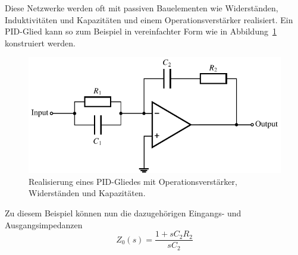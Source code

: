 Diese Netzwerke werden oft mit passiven Bauelementen wie Widerständen, Induktivitäten und Kapazitäten und einem Operationsverstärker realisiert.
%
%
%
%
%
Ein PID-Glied kann so zum Beispiel in vereinfachter Form wie in
%
Abbildung~\ref{pade:pid-circuit} konstruiert werden.
\begin{figure}
\centering
%
%
%
%
\includegraphics{papers/pade/pid.pdf}
\caption{Realisierung eines PID-Gliedes mit Operationsverstärker,
Widerständen und Kapazitäten.
\label{pade:pid-circuit}}
\end{figure}
Zu diesem Beispiel können nun die dazugehörigen Eingangs- und
Ausgangsimpedanzen
%
%
%
\begin{equation*}
Z_{0}(s)
=
\frac{1+s C_{2} R_{2}}{s C_{2}}
\end{equation*}
